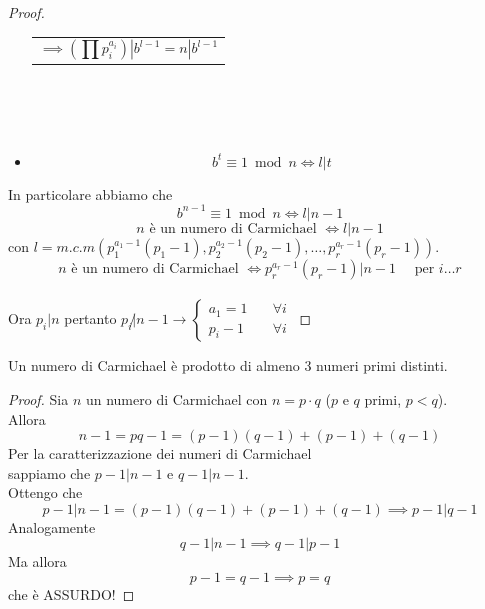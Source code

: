 \documentclass[a4paper,12pt, oneside]{book}
\begin{document}
\begin{proof}
\begin{itemize}
\begin{minipage}{0.45\textwidth}
\begin{tabular}{|p{\textwidth}}
								$$\implies (\prod p_{i}^{a_i}) | b^{l-1} = n| b^{l-1}$$\\
								
							\end{tabular}
						\end{minipage}\\\\\\%
					
					\item $$b^t \equiv 1 \bmod n \iff l|t$$
				\end{itemize}
				In particolare abbiamo che 
				$$b^{n-1} \equiv 1 \bmod n \iff l|n-1$$
				$$n \mbox{ è un numero di Carmichael } \iff l|n-1$$
				con $l=m.c.m( p_{1}^{a_{1}-1}(p_{1}-1), p_{2}^{a_{2}-1}(p_{2}-1), \dots, p_{r}^{a_{r}-1}(p_{r}-1) )$.
				$$n \mbox{ è un numero di Carmichael } \iff p_{r}^{a_{r}-1}(p_{r}-1)|n-1 \quad \mbox{ per } i \dots r$$\\
				Ora $p_i|n$ pertanto $p_i \not | n-1 \rightarrow \begin{cases}
				a_1 = 1 & \quad \forall i \\
				p_i -1  & \quad \forall i
				\end{cases}$
				
			\end{proof}
			
			\begin{corollario}
				Un numero di Carmichael è prodotto di almeno 3 numeri primi distinti.
				\begin{proof}
					Sia $n$ un numero di Carmichael con $n=p \cdot q$ ($p$ e $q$ primi, $p<q$).\\
					Allora
					$$n-1 = pq-1 = (p-1)(q-1) + (p-1) + (q-1)$$
					Per la caratterizzazione dei numeri di Carmichael\\ sappiamo che $p-1|n-1$ e $q-1|n-1$.\\
					Ottengo che
					$$p-1|n-1=(p-1)(q-1) + (p-1) +(q-1) \implies p-1|q-1$$
					Analogamente
					$$q-1|n-1 \implies q-1|p-1$$
					Ma allora 
					$$p-1=q-1 \implies p=q$$
					che è ASSURDO!					
				\end{proof}
			\end{corollario}
			
\end{document}
